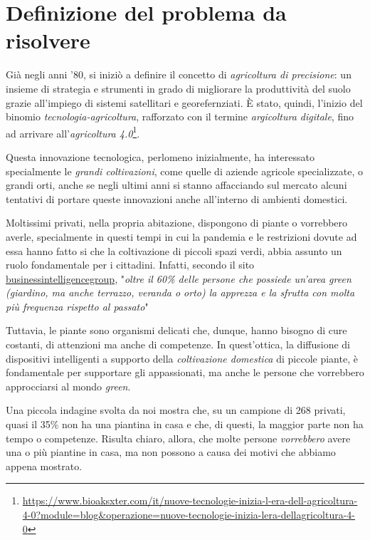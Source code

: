 \section{Definizione del problema da risolvere}

Già negli anni '80, si iniziò a definire il concetto di \textit{agricoltura di precisione}: un insieme di strategia e strumenti in grado di migliorare la produttività del suolo grazie all'impiego di sistemi satellitari e georefernziati. \`E stato, quindi, l'inizio del binomio \textit{tecnologia-agricoltura}, rafforzato con il termine \textit{argicoltura digitale}, fino ad arrivare all'\textit{agricoltura 4.0}\footnote{\url{https://www.bioaksxter.com/it/nuove-tecnologie-inizia-l-era-dell-agricoltura-4-0?module=blog&operazione=nuove-tecnologie-inizia-lera-dellagricoltura-4-0}}.

Questa innovazione tecnologica, perlomeno inizialmente, ha interessato specialmente le \textit{grandi coltivazioni}, come quelle di aziende agricole specializzate, o grandi orti, anche se negli ultimi anni si stanno affacciando sul mercato alcuni tentativi di portare queste innovazioni anche all'interno di ambienti domestici.

Moltissimi privati, nella propria abitazione, dispongono di piante o vorrebbero averle, specialmente in questi tempi in cui la pandemia e le restrizioni dovute ad essa hanno fatto si che la coltivazione di piccoli spazi verdi, abbia assunto un ruolo fondamentale per i cittadini. Infatti, secondo il sito \href{https://www.businessintelligencegroup.it/quanto-vale-il-mercato-del-giardinaggio-in-italia/}{businessintelligencegroup}, "\textit{oltre il 60\% delle persone che possiede un’area green (giardino, ma anche terrazzo, veranda o orto) la apprezza e la sfrutta con molta più frequenza rispetto al passato}"

Tuttavia, le piante sono organismi delicati che, dunque, hanno bisogno di cure costanti, di attenzioni ma anche di competenze. In quest'ottica, la diffusione di dispositivi intelligenti a supporto della \textit{coltivazione domestica} di piccole piante, è fondamentale per supportare gli appassionati, ma anche le persone che vorrebbero approcciarsi al mondo \textit{green}.

Una piccola indagine svolta da noi mostra che, su un campione di 268 privati, quasi il 35\% non ha una piantina in casa e che, di questi, la maggior parte non ha tempo o competenze.
Risulta chiaro, allora, che molte persone \textit{vorrebbero} avere una o più piantine in casa, ma non possono a causa dei motivi che abbiamo appena mostrato.

